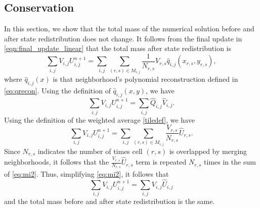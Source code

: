 \subsection{Conservation}\label{sec:cons}
In this section, we show that the total mass of the numerical solution before and after state redistribution does not change.  It follows from the final update in \eqref{eqn:final_update_linear} that the total mass after state redistribution is
\begin{equation}\label{eq:mi}
\sum_{i,j} V_{i,j} U^{n+1}_{i,j} = \sum_{i,j} \sum_{(r,s) \in
M_{i,j}}\frac{1}{N_{r,s}} V_{r,s} \widehat q_{i,j}(x_{r,s},y_{r,s}) ,
\end{equation}
where $\widehat q_{i,j}(x)$ is that neighborhood's polynomial reconstruction defined in \eqref{eq:qrecon}.
Using the definition
of $\widehat{q}_{i,j}(x,y)$, we have
\begin{equation}\label{eq:mi1}
\sum_{i,j} V_{i,j} U^{n+1}_{i,j} = \sum_{i,j} \widehat {Q}_{i,j} 
\widehat {V}_{i,j}.
\end{equation}
Using the definition of the weighted average \eqref{tiledef}, we have
\begin{equation}\label{eq:mi2}
\sum_{i,j} V_{i,j} U^{n+1}_{i,j} = \sum_{i,j} \sum_{(r,s) \in M_{i,j} }\frac{V_{r,s}}{N_{r,s}} \widehat U_{r,s}.
\end{equation}
Since $N_{r,s}$ indicates the number of times cell $(r,s)$ is overlapped by merging neighborhoods, it follows that the $\frac{V_{r,s}}{N_{r,s}} \widehat U_{r,s}$ term is repeated $N_{r,s}$ times in the sum of \eqref{eq:mi2}.  Thus, simplifying \eqref{eq:mi2}, it follows that
\begin{equation} \label{eq:final}
\sum_{i,j} V_{i,j} U^{n+1}_{i,j} = \sum_{i,j} V_{i,j} \widehat U_{i,j}
\end{equation}
and the total mass before and after state redistribution is the same.
